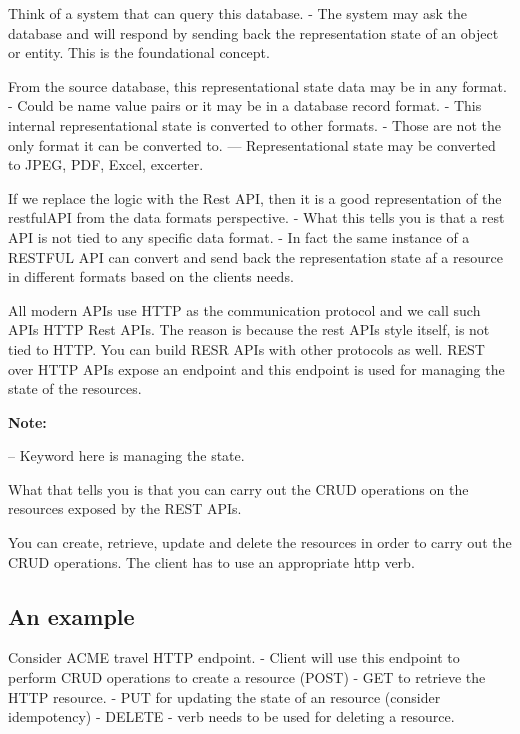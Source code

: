 \documentclass[a4paper, 11pt]{book}
\newenvironment{note}{
    \begin{siderule}
        \textbf{Note: }
        }{
    \end{siderule}
}
\begin{document}
    Think of a system that can query this database.
    - The system may ask the database and will respond by sending back the representation state of an object or entity.
    This is the foundational concept.

    From the source database, this representational state data may be in any format.
    - Could be name value pairs or it may be in a database record format.
    - This internal representational state is converted to other formats.
    - Those are not the only format it can be converted to.
    --- Representational state may be converted to JPEG, PDF, Excel, excerter.

    If we replace the logic with the Rest API, then it is a good representation of the restfulAPI from the data formats perspective.
    - What this tells you is that a rest API is not tied to any specific data format.
    - In fact the same instance of a RESTFUL API can convert and send back the representation state af a resource in different formats based on the clients needs.

    All modern APIs use HTTP as the communication protocol and we call such APIs HTTP Rest APIs.
    The reason is because the rest APIs style itself, is not tied to HTTP.
    You can build RESR APIs with other protocols as well.
    REST over HTTP APIs expose an endpoint and this endpoint is used for managing the state of the resources.

    \begin{note}
        -- Keyword here is managing the state.
    \end{note}

    What that tells you is that you can carry out the CRUD operations on the resources exposed by the REST APIs.

    You can create, retrieve, update and delete the resources in order to carry out the CRUD operations.
    The client has to use an appropriate http verb.

    \subsection{An example}
    Consider ACME travel HTTP endpoint.
    - Client will use this endpoint to perform CRUD operations to create a resource (POST)
    - GET to retrieve the HTTP resource.
    - PUT for updating the state of an resource (consider idempotency)
    - DELETE - verb needs to be used for deleting a resource.
\end{document}

